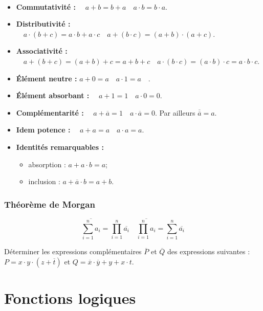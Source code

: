 \begin{prop} ~\\

\begin{itemize}
\item \textbf{Commutativité :} $\quad a+b = b+a \quad a\cdot b = b\cdot a$.
\item \textbf{Distributivité :} $\quad a\cdot (b+c) = a\cdot b+a \cdot c \quad  a+(b\cdot c) = (a+b) \cdot (a+c)$.
\item \textbf{Associativité :} $\quad a + (b+c) = (a+b)+c = a+b+c \quad a \cdot (b\cdot c) = (a\cdot b)\cdot c = a \cdot b\cdot c$.
\item \textbf{Élément neutre :} $ a + 0 = a \quad a\cdot 1 = a \quad$.
\item \textbf{Élément absorbant :} $\quad  a + 1 = 1 \quad a\cdot 0 = 0$.
\item \textbf{Complémentarité :} $ \quad a + \overline{a} = 1\quad  a\cdot \overline{a} = 0$.
Par ailleurs $\overline{\overline{a}}=a$.
\item \textbf{Idem potence :} $\quad a + a = a \quad a\cdot a = a$.
\item \textbf{Identités remarquables :}
\begin{itemize} 
\item absorption : $ a + a\cdot b = a$;
\item inclusion : $a+\overline{a}\cdot b = a+b$.
\end{itemize}
\end{itemize}
\end{prop}

\subsubsection{Théorème de Morgan}
\begin{theorem}
$$
\overline{\sum\limits_{i=1}^{n} a_i} = \prod\limits_{i=1}^n \overline{a_i}
\quad
\overline{\prod\limits_{i=1}^{n} a_i} = \sum\limits_{i=1}^n \overline{a_i}
$$
\end{theorem}

\begin{exemple}
Déterminer les expressions complémentaires $\overline{P}$ et $\overline{Q}$ des expressions suivantes : 
$P = x\cdot y \cdot (z + \overline{t})$ et $Q=\overline{x}\cdot\overline{y} + y + x\cdot t$.
\end{exemple}

\section{Fonctions logiques}

